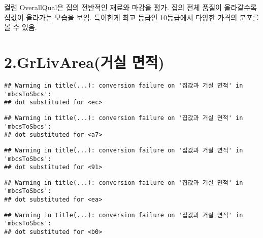 \documentclass[
]{article}
\newenvironment{Shaded}{\begin{snugshade}}{\end{snugshade}}
\newcommand{\AttributeTok}[1]{\textcolor[rgb]{0.77,0.63,0.00}{#1}}
\newcommand{\DecValTok}[1]{\textcolor[rgb]{0.00,0.00,0.81}{#1}}
\newcommand{\FunctionTok}[1]{\textcolor[rgb]{0.00,0.00,0.00}{#1}}
\newcommand{\NormalTok}[1]{#1}
\newcommand{\SpecialCharTok}[1]{\textcolor[rgb]{0.00,0.00,0.00}{#1}}
\newcommand{\StringTok}[1]{\textcolor[rgb]{0.31,0.60,0.02}{#1}}
\begin{document}
컬럼 OverallQual은 집의 전반적인 재료와 마감을 평가. 집의 전체 품질이
올라갈수록 집값이 올라가는 모습을 보임. 특이한게 최고 등급인 10등급에서
다양한 가격의 분포를 볼 수 있음.

\hypertarget{grlivareauxac70uxc2e4-uxba74uxc801}{%
\section{2.GrLivArea(거실
면적)}\label{grlivareauxac70uxc2e4-uxba74uxc801}}

\begin{Shaded}
\end{Shaded}

\begin{verbatim}
## Warning in title(...): conversion failure on '집값과 거실 면적' in 'mbcsToSbcs':
## dot substituted for <ec>
\end{verbatim}

\begin{verbatim}
## Warning in title(...): conversion failure on '집값과 거실 면적' in 'mbcsToSbcs':
## dot substituted for <a7>
\end{verbatim}

\begin{verbatim}
## Warning in title(...): conversion failure on '집값과 거실 면적' in 'mbcsToSbcs':
## dot substituted for <91>
\end{verbatim}

\begin{verbatim}
## Warning in title(...): conversion failure on '집값과 거실 면적' in 'mbcsToSbcs':
## dot substituted for <ea>
\end{verbatim}

\begin{verbatim}
## Warning in title(...): conversion failure on '집값과 거실 면적' in 'mbcsToSbcs':
## dot substituted for <b0>
\end{verbatim}
\end{document}

